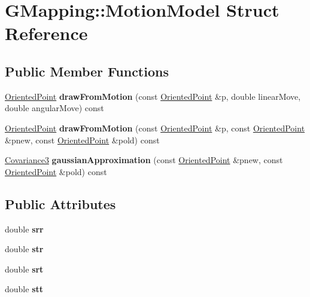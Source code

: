 \hypertarget{structGMapping_1_1MotionModel}{}\section{G\+Mapping\+:\+:Motion\+Model Struct Reference}
\label{structGMapping_1_1MotionModel}
\subsection*{Public Member Functions}
\begin{DoxyCompactItemize}
\item 
\mbox{\label{structGMapping_1_1MotionModel_ad7db4e12da0f04f5338b6fad17b9a449}} 
\hyperlink{structGMapping_1_1orientedpoint}{Oriented\+Point} {\bfseries draw\+From\+Motion} (const \hyperlink{structGMapping_1_1orientedpoint}{Oriented\+Point} \&p, double linear\+Move, double angular\+Move) const
\item 
\mbox{\label{structGMapping_1_1MotionModel_ab43a9c5433ea162ba213cbd31c856f70}} 
\hyperlink{structGMapping_1_1orientedpoint}{Oriented\+Point} {\bfseries draw\+From\+Motion} (const \hyperlink{structGMapping_1_1orientedpoint}{Oriented\+Point} \&p, const \hyperlink{structGMapping_1_1orientedpoint}{Oriented\+Point} \&pnew, const \hyperlink{structGMapping_1_1orientedpoint}{Oriented\+Point} \&pold) const
\item 
\mbox{\label{structGMapping_1_1MotionModel_ae0de3d2abdc87b040825f6e440e25a48}} 
\hyperlink{structGMapping_1_1Covariance3}{Covariance3} {\bfseries gaussian\+Approximation} (const \hyperlink{structGMapping_1_1orientedpoint}{Oriented\+Point} \&pnew, const \hyperlink{structGMapping_1_1orientedpoint}{Oriented\+Point} \&pold) const
\end{DoxyCompactItemize}
\subsection*{Public Attributes}
\begin{DoxyCompactItemize}
\item 
\mbox{\label{structGMapping_1_1MotionModel_aee71b09737b96073a3573589eccfe4e9}} 
double {\bfseries srr}
\item 
\mbox{\label{structGMapping_1_1MotionModel_a71d8c1a219b92804770ca27b4b48c4d6}} 
double {\bfseries str}
\item 
\mbox{\label{structGMapping_1_1MotionModel_aeeeec3e6a5230f2851e7b4cd07a862a2}} 
double {\bfseries srt}
\item 
\mbox{\label{structGMapping_1_1MotionModel_a459aa742e5ae4b3d50b1441b75a9ea3d}} 
double {\bfseries stt}
\end{DoxyCompactItemize}


